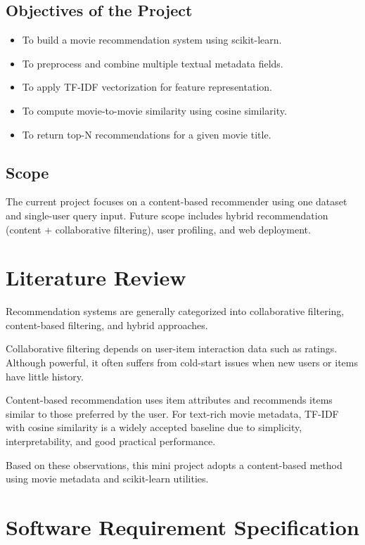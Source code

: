 \documentclass[12pt,a4paper]{report}
\begin{document}
\section{Objectives of the Project}
\begin{itemize}[leftmargin=1.2cm]
\item To build a movie recommendation system using scikit-learn.
\item To preprocess and combine multiple textual metadata fields.
\item To apply TF-IDF vectorization for feature representation.
\item To compute movie-to-movie similarity using cosine similarity.
\item To return top-N recommendations for a given movie title.
\end{itemize}

\section{Scope}
The current project focuses on a content-based recommender using one dataset and
single-user query input. Future scope includes hybrid recommendation (content +
collaborative filtering), user profiling, and web deployment.

\chapter{Literature Review}

Recommendation systems are generally categorized into collaborative filtering,
content-based filtering, and hybrid approaches.

Collaborative filtering depends on user-item interaction data such as ratings.
Although powerful, it often suffers from cold-start issues when new users or items
have little history.

Content-based recommendation uses item attributes and recommends items similar to
those preferred by the user. For text-rich movie metadata, TF-IDF with cosine
similarity is a widely accepted baseline due to simplicity, interpretability, and
good practical performance.

Based on these observations, this mini project adopts a content-based method using
movie metadata and scikit-learn utilities.

\chapter{Software Requirement Specification}
\end{document}
